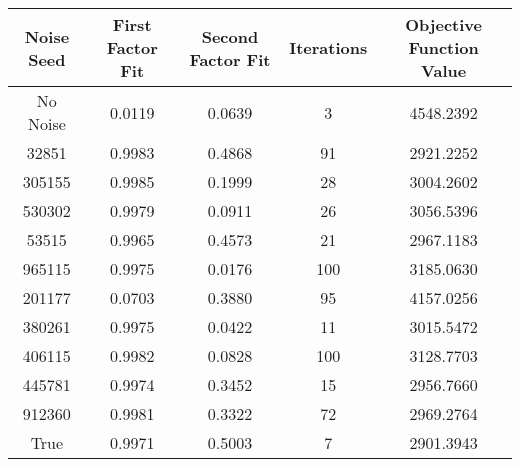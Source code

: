 \begin{tabular}{ccccc}
   
Noise Seed & First Factor Fit & Second Factor Fit & Iterations & Objective Function Value \\
 \hline
No Noise & 0.0119 & 0.0639 &     3 & 4548.2392 \\ 
  32851 & 0.9983 & 0.4868 &    91 & 2921.2252 \\ 
  305155 & 0.9985 & 0.1999 &    28 & 3004.2602 \\ 
  530302 & 0.9979 & 0.0911 &    26 & 3056.5396 \\ 
  53515 & 0.9965 & 0.4573 &    21 & 2967.1183 \\ 
  965115 & 0.9975 & 0.0176 &   100 & 3185.0630 \\ 
  201177 & 0.0703 & 0.3880 &    95 & 4157.0256 \\ 
  380261 & 0.9975 & 0.0422 &    11 & 3015.5472 \\ 
  406115 & 0.9982 & 0.0828 &   100 & 3128.7703 \\ 
  445781 & 0.9974 & 0.3452 &    15 & 2956.7660 \\ 
  912360 & 0.9981 & 0.3322 &    72 & 2969.2764 \\ 
  True & 0.9971 & 0.5003 &     7 & 2901.3943 \\ 
  \end{tabular}
